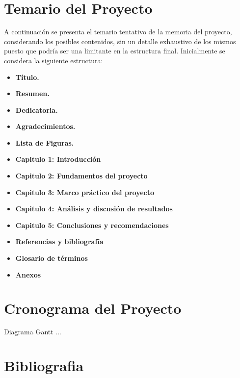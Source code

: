\documentclass[12pt,letterpaper]{article}
\begin{document}
\section{Temario del Proyecto}
A continuación se presenta el temario tentativo de la memoria del proyecto, 
considerando los posibles contenidos, sin un detalle exhaustivo de los mismos 
puesto que podría ser una limitante en la estructura final. 
Inicialmente se considera la siguiente estructura:\\

\begin{itemize}

\item \textbf{Título.}

\item \textbf{Resumen.}

\item \textbf{Dedicatoria.}

\item \textbf{Agradecimientos.}

\item \textbf{Lista de Figuras.}

\item \textbf{Capitulo 1: Introducción}  

\item \textbf{Capitulo 2: Fundamentos del proyecto}  

\item \textbf{Capitulo 3: Marco práctico del proyecto} 

\item \textbf{Capitulo 4: Análisis y discusión de resultados}

\item \textbf{Capitulo 5: Conclusiones y recomendaciones}

\item \textbf{Referencias y bibliografía}

\item \textbf{Glosario de términos}

\item \textbf{Anexos}
\end{itemize}

 
\section{Cronograma del Proyecto}

Diagrama Gantt ...

\section{Bibliografia}



\end{document}
